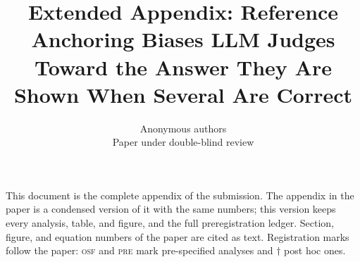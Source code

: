 \documentclass{article}
\title{Extended Appendix: Reference Anchoring Biases LLM Judges\\Toward the Answer They Are Shown When Several Are Correct}
\author{Anonymous authors\\Paper under double-blind review}
\begin{document}
\maketitle
\raggedbottom

\noindent This document is the complete appendix of the submission. The appendix in the paper is a condensed version of it with the same numbers; this version keeps every analysis, table, and figure, and the full preregistration ledger. Section, figure, and equation numbers of the paper are cited as text. Registration marks follow the paper: \textsc{osf} and \textsc{pre} mark pre-specified analyses and $\dagger$ post hoc ones.

\appendix
{}




\end{document}

